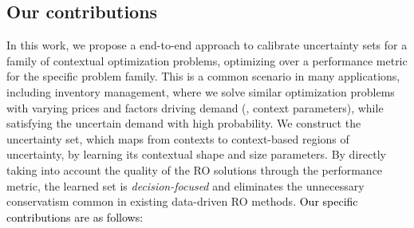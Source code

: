 \documentclass[11pt]{article}
\newcommand{\RC}[1]{\textcolor{black}{#1}}
\begin{document}
\subsection{Our contributions}%
\label{sub:our_contributions}
In this work, we propose a end-to-end approach to calibrate uncertainty sets for a family of contextual optimization problems, optimizing over a performance metric for the specific problem family.
This is a common scenario in many applications, including inventory management, where we solve similar optimization problems with varying prices and factors driving demand (\ie, context parameters), while satisfying the uncertain demand with high probability.
We construct the uncertainty set, which maps from contexts to context-based regions of uncertainty, by learning its contextual shape and size parameters.
By directly taking into account the quality of the \gls{RO} solutions through the performance metric,
the learned set is {\it decision-focused} and eliminates the unnecessary conservatism common in existing data-driven \gls{RO} methods. 
\RC{Our specific contributions are as follows:}
\end{document}
